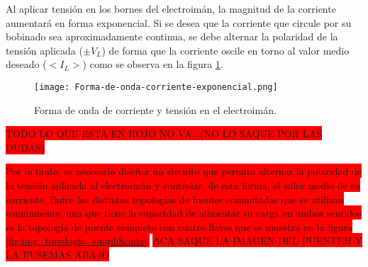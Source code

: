 Al aplicar tensión en los bornes del electroimán, la magnitud de la corriente aumentará en forma exponencial. Si se desea que la corriente que circule por su bobinado sea aproximadamente continua, se debe alternar la polaridad de la tensión aplicada ($\pm V_L$) de forma que la corriente oscile en torno al valor medio deseado ($<I_L>$) como se observa en la figura \ref{fig:img_corriente_exponencial}.

\begin{figure}[H]
	\centering
	\texttt{[image: Forma-de-onda-corriente-exponencial.png]}
	\caption{Forma de onda de corriente y tensión en el electroimán.}
	\label{fig:img_corriente_exponencial}
\end{figure}



\colorbox{red}{TODO LO QUE ESTA EN ROJO NO VA...(NO LO SAQUE POR LAS DUDAS)}

\colorbox{red}{
Por lo tanto, es necesario diseñar un circuito que permita alternar la polaridad de la tensión aplicada al electroimán y controlar, de esta forma, el valor medio de su corriente. Entre las distintas topologías de fuentes conmutadas que se utilizan comúnmente, una que tiene la capacidad de alimentar su carga en ambos sentidos es la topología de puente completo con cuatro llaves que se muestra en la figura \ref{fig:img_topologia_simplificada}.}
\colorbox{red}{ACA SAQUE LA IMAGEN DEL PUENTEH Y LA PUSEMAS ABAJO}



